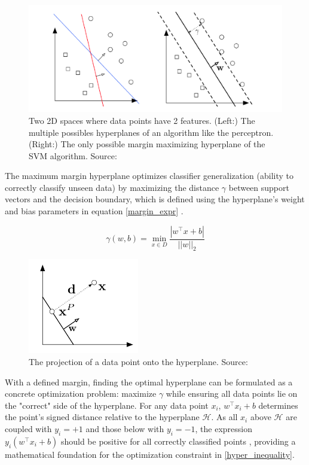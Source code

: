 \begin{figure}
    \centering
    \includegraphics[width=0.75\linewidth]{images/hyperplane.png}
    \caption{Two 2D spaces where data points have 2 features. (Left:) The multiple possibles hyperplanes of an algorithm like the perceptron. (Right:) The only possible margin maximizing hyperplane of the SVM algorithm. Source: \cite{cornell_svm_notes}}
    \label{fig:hyperplane}
\end{figure}

The maximum margin hyperplane optimizes classifier generalization (ability to correctly classify unseen data) by maximizing the distance $\gamma$ between support vectors and the decision boundary, which is defined using the hyperplane's weight and bias parameters in equation \ref{margin_expr} \cite{cornell_svm}.

\begin{equation}\label{margin_expr}
    \gamma(w,b)=\min_{x\in D} \frac{|w^\top x + b|}{||w||_{2}}
\end{equation}

\begin{figure}
    \centering
    \includegraphics[width=0.35\linewidth]{images/hyperplane_geometry.png}
    \caption{The projection of a data point onto the hyperplane. Source: \cite{cornell_svm_notes}}
    \label{fig:hyperplane_geometry}
\end{figure}

With a defined margin, finding the optimal hyperplane can be formulated as a concrete optimization problem: maximize $\gamma$ while ensuring all data points lie on the "correct" side of the hyperplane. For any data point $x_i$,  $w^\top x_i + b$ determines the point's signed distance relative to the hyperplane $\mathcal{H}$. As all $x_i$ above $\mathcal{H}$ are coupled with $y_i=+1$ and those below with $y_i=-1$, the expression $y_{i}(w^\top x_{i}+b)$ should be positive for all correctly classified points \cite{ng_support}, providing a mathematical foundation for the optimization constraint in \ref{hyper_inequality}.

